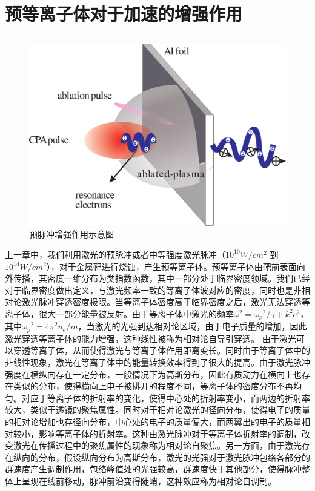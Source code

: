 
\chapter{预等离子体对于加速的增强作用}
\label{chap:preplasmaEhancement}




\section{}
\begin{figure}[!htbp]
  \centering
  \includegraphics[width=\MyFactor\textwidth]{Img/enhancement.eps}
  \caption{预脉冲增强作用示意图}
  \label{fig:prepulse2012}
\end{figure}

上一章中，我们利用激光的预脉冲或者中等强度激光脉冲（$10^{10}W/cm^2$ 到 $10^{14}W/cm^2$），对于金属靶进行烧蚀，产生预等离子体。预等离子体由靶前表面向外传播，其密度一维分布为类指数函数，其中一部分处于临界密度领域。我们已经对于临界密度做出定义，与激光频率一致的等离子体波对应的密度，同时也是非相对论激光脉冲穿透密度极限。当等离子体密度高于临界密度之后，激光无法穿透等离子体，很大一部分能量被反射。由于等离子体中激光的频率${\omega}^2={{\omega}_p}^2/{\gamma} +k^2 c^2$，其中${{\omega}_p}^2=4 {\pi}^2 n_e/m $，当激光的光强到达相对论区域，由于电子质量的增加，因此激光穿透等离子体的能力增强，这种线性被称为相对论自导引穿透。
由于激光可以穿透等离子体，从而使得激光与等离子体作用距离变长。同时由于等离子体中的非线性现象，激光在等离子体中的能量转换效率得到了很大的提高。由于激光脉冲强度在横纵向存在一定分布，一般情况下为高斯分布，因此有质动力在横向上也存在类似的分布，使得横向上电子被排开的程度不同，等离子体的密度分布不再均匀。对应于等离子体的折射率的变化，使得中心处的折射率变小，而两边的折射率较大，类似于透镜的聚焦属性。同时对于相对论激光的径向分布，使得电子的质量的相对论增加也存径向分布，中心处的电子的质量偏大，而两翼出的电子的质量相对较小，影响等离子体的折射率。这种由激光脉冲对于等离子体折射率的调制，改变激光在传播过程中的聚焦属性的现象称为相对论自聚焦。另一方面，由于激光存在纵向的分布，假设纵向分布为高斯分布，激光的光强对于激光脉冲包络各部分的群速度产生调制作用，包络峰值处的光强较高，群速度快于其他部分，使得脉冲整体上呈现在线前移动，脉冲前沿变得陡峭，这种效应称为相对论自调制。

